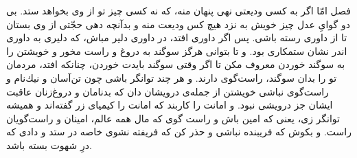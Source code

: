 فصل امّا اگر به كسى وديعتى نهى پنهان منه، كه نه كسى چيز تو از وى بخواهد  ستد. بى دو گواىِ عدل چيز خويش به نزد هيچ كس وديعت منه و بدآنچه دهى حجّتى از وى بستان تا از داورى رسته باشى. پس اگر داورى افتد، در داورى دلير مباش، كه دليرى به داورى اندر نشان ستمكارى بود. و تا بتوانى هرگز سوگند به دروغ و راست مخور و خويشتن را به سوگند خوردن معروف مكن تا اگر وقتى سوگند بايدت خوردن، چنانكه افتد، مردمان تو را بدان سوگند، راست‌گوى دارند. و هر چند توانگر باشى چون تن‌آسان و نيك‌نام و راست‌گوى نباشى خويشتن از جمله‌ی درويشان دان كه بدنامان و دروغ‌زنان عاقبت ايشان جز درويشى نبود. و امانت را كاربند كه امانت را كيمياى زر گفته‌اند و هميشه توانگر زى، يعنى كه امين باش و راست گوى كه مال همه عالم، امينان و راست‌گويان راست. و بكوش كه فريبنده نباشى و حذر كن كه فريفته نشوى خاصه در ستد و دادى كه درِ شهوت بسته باشد.

\newpage


















